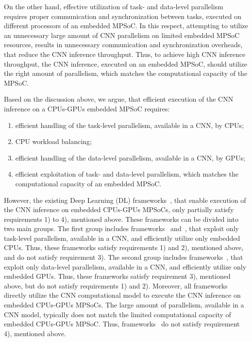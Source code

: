 On the other hand, effective utilization of task- and data-level parallelism requires proper  communication and synchronization between tasks, executed on different processors of an embedded MPSoC. In this respect, attempting to utilize an  unnecessary large amount of CNN parallelism on limited embedded MPSoC resources, results in unnecessary communication and synchronization overheads, that reduce the CNN inference throughput. Thus, to achieve high CNN inference throughput, the CNN inference, executed on an embedded MPSoC, should utilize the right amount of parallelism, which matches the computational capacity of the MPSoC.  

Based on the discussion above, we argue, that  efficient  execution of the CNN inference on a CPUs-GPUs embedded MPSoC requires:  

\begin{enumerate}
\item{efficient handling of the task-level parallelism, available in a CNN, by CPUs;}
\item{CPU workload balancing;}
\item{efficient handling of the data-level parallelism, available in a CNN, by GPUs;}
\item{efficient exploitation of task- and data-level parallelism, which matches the computational capacity of an embedded MPSoC.}
\end{enumerate}

However, the existing Deep Learning (DL) frameworks~\cite{tensorflow2015, Caffe2, DLSurvey17, HyPar19,  Tensorrt, Kang2018CGOODCG, Loc2016DeepSenseAG, DeepMon17,Wang2019HighThroughputCI, Tang2018SchedulingCG}, that enable execution of the CNN inference on embedded CPUs-GPUs MPSoCs, only partially satisfy requirements 1) to 4), mentioned above. These frameworks can be divided into two main groups. The first group includes frameworks~\cite{Wang2019HighThroughputCI} and~\cite{Tang2018SchedulingCG}, that exploit  only task-level parallelism, available in a CNN, and efficiently utilize only embedded CPUs. Thus, these frameworks satisfy requirements 1) and 2), mentioned above, and do not satisfy requirement 3). The second group includes frameworks~\cite{tensorflow2015, Caffe2, DLSurvey17, HyPar19,  Tensorrt, Kang2018CGOODCG, Loc2016DeepSenseAG, DeepMon17}, that exploit only data-level parallelism, available in a CNN, and efficiently utilize only embedded GPUs. Thus, these frameworks satisfy requirement 3), mentioned above, but do not satisfy requirements 1) and 2). Moreover, all frameworks~\cite{tensorflow2015, Caffe2, DLSurvey17, HyPar19,  Tensorrt, Kang2018CGOODCG, Loc2016DeepSenseAG, DeepMon17,Wang2019HighThroughputCI, Tang2018SchedulingCG} directly utilize the CNN computational model to execute the CNN inference on embedded CPUs-GPUs MPSoCs. The large amount of parallelism, available in a CNN model, typically  does not match the limited computational capacity of embedded CPUs-GPUs MPSoC. Thus, frameworks~\cite{tensorflow2015, Caffe2, DLSurvey17, HyPar19,  Tensorrt, Kang2018CGOODCG, Loc2016DeepSenseAG, DeepMon17,Wang2019HighThroughputCI, Tang2018SchedulingCG} do not satisfy requirement 4), mentioned above. 

